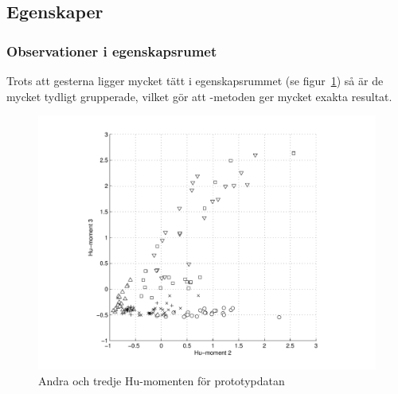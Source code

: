 \documentclass[../rapport_MVEX01-11-05]{subfiles}
\begin{document}
\subsection{Egenskaper}

\subsubsection{Observationer i egenskapsrumet}


Trots att gesterna ligger mycket tätt i egenskapsrummet (se
figur~\ref{fig:feats1011}) så är de mycket tydligt grupperade, vilket 
gör att \knn-metoden ger mycket exakta resultat.

\begin{figure}[htbp]
  \centering
  \includegraphics[width=\textwidth]{bilder/feats-10+11}
  \caption{Andra och tredje Hu-momenten för prototypdatan}
  \label{fig:feats1011}
\end{figure}
\end{document}
